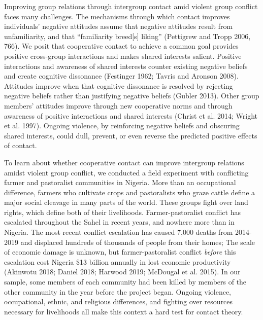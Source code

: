 \documentclass[11pt]{article}
\begin{document}
Improving group relations through intergroup contact amid violent group
conflict faces many challenges. The mechanisms through which contact
improves individuals' negative attitudes assume that negative attitudes
result from unfamiliarity, and that ``familiarity breed{[}s{]} liking''
(Pettigrew and Tropp 2006, 766). We posit that cooperative contact to
achieve a common goal provides positive cross-group interactions and
makes shared interests salient. Positive interactions and awareness of
shared interests counter existing negative beliefs and create cognitive
dissonance (Festinger 1962; Tavris and Aronson 2008). Attitudes improve
when that cognitive dissonance is resolved by rejecting negative beliefs
rather than justifying negative beliefs (Gubler 2013). Other group
members' attitudes improve through new cooperative norms and through
awareness of positive interactions and shared interests (Christ et al.
2014; Wright et al. 1997). Ongoing violence, by reinforcing negative
beliefs and obscuring shared interests, could dull, prevent, or even
reverse the predicted positive effects of contact.

To learn about whether cooperative contact can improve intergroup
relations amidst violent group conflict, we conducted a field experiment
with conflicting farmer and pastoralist communities in Nigeria. More
than an occupational difference, farmers who cultivate crops and
pastoralists who graze cattle define a major social cleavage in many
parts of the world. These groups fight over land rights, which define
both of their livelihoods. Farmer-pastoralist conflict has escalated
throughout the Sahel in recent years, and nowhere more than in Nigeria.
The most recent conflict escalation has caused 7,000 deaths from
2014-2019 and displaced hundreds of thousands of people from their
homes; The scale of economic damage is unknown, but farmer-pastoralist
conflict \emph{before} this escalation cost Nigeria \$13 billion
annually in lost economic productivity (Akinwotu 2018; Daniel 2018;
Harwood 2019; McDougal et al. 2015). In our sample, some members of each
community had been killed by members of the other community in the year
before the project began. Ongoing violence, occupational, ethnic, and
religious differences, and fighting over resources necessary for
livelihoods all make this context a hard test for contact theory.
\end{document}
